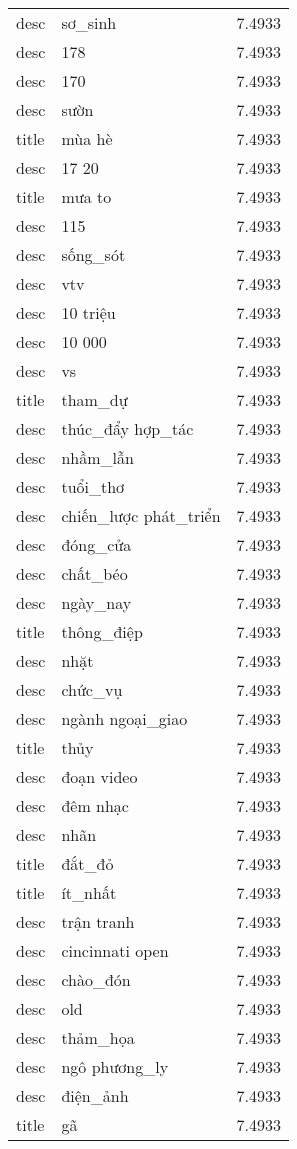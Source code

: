 \documentclass{article}
\begin{document}
\begin{tabular}{lll}
desc & sơ\_sinh & 7.4933\\
desc & 178 & 7.4933\\
desc & 170 & 7.4933\\
desc & sườn & 7.4933\\
title & mùa hè & 7.4933\\
desc & 17 20 & 7.4933\\
title & mưa to & 7.4933\\
desc & 115 & 7.4933\\
desc & sống\_sót & 7.4933\\
desc & vtv & 7.4933\\
desc & 10 triệu & 7.4933\\
desc & 10 000 & 7.4933\\
desc & vs & 7.4933\\
title & tham\_dự & 7.4933\\
desc & thúc\_đẩy hợp\_tác & 7.4933\\
desc & nhầm\_lẫn & 7.4933\\
desc & tuổi\_thơ & 7.4933\\
desc & chiến\_lược phát\_triển & 7.4933\\
desc & đóng\_cửa & 7.4933\\
desc & chất\_béo & 7.4933\\
desc & ngày\_nay & 7.4933\\
title & thông\_điệp & 7.4933\\
desc & nhặt & 7.4933\\
desc & chức\_vụ & 7.4933\\
desc & ngành ngoại\_giao & 7.4933\\
title & thủy & 7.4933\\
desc & đoạn video & 7.4933\\
desc & đêm nhạc & 7.4933\\
desc & nhãn & 7.4933\\
title & đắt\_đỏ & 7.4933\\
title & ít\_nhất & 7.4933\\
desc & trận tranh & 7.4933\\
desc & cincinnati open & 7.4933\\
desc & chào\_đón & 7.4933\\
desc & old & 7.4933\\
desc & thảm\_họa & 7.4933\\
desc & ngô phương\_ly & 7.4933\\
desc & điện\_ảnh & 7.4933\\
title & gã & 7.4933\\

\end{tabular}
\end{document}
